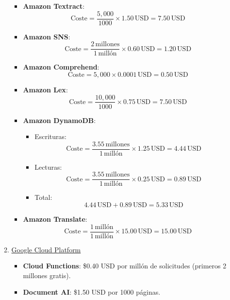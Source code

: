\begin{enumerate}
\begin{enumerate}
\begin{itemize}
					\item \textbf{Amazon Textract}:
						\[
							\text{Coste}= \frac{5,000}{1000}\times 1.50 \, \text{USD}= 7.50 \,
							\text{USD}
						\]

					\item \textbf{Amazon SNS}:
						\[
							\text{Coste}= \frac{2 \, \text{millones}}{1 \, \text{millón}}\times
							0.60 \, \text{USD}= 1.20 \, \text{USD}
						\]

					\item \textbf{Amazon Comprehend}:
						\[
							\text{Coste}= 5,000 \times 0.0001 \, \text{USD}= 0.50 \, \text{USD}
						\]

					\item \textbf{Amazon Lex}:
						\[
							\text{Coste}= \frac{10,000}{1000}\times 0.75 \, \text{USD}= 7.50 \,
							\text{USD}
						\]

					\item \textbf{Amazon DynamoDB}:
						\begin{itemize}
							\item Escrituras:
								\[
									\text{Coste}= \frac{3.55 \, \text{millones}}{1 \,
									\text{millón}}\times 1.25 \, \text{USD}= 4.44 \, \text{USD}
								\]

							\item Lecturas:
								\[
									\text{Coste}= \frac{3.55 \, \text{millones}}{1 \,
									\text{millón}}\times 0.25 \, \text{USD}= 0.89 \, \text{USD}
								\]

							\item Total:
								\[
									4.44 \, \text{USD}+ 0.89 \, \text{USD}= 5.33 \, \text{USD}
								\]
						\end{itemize}

					\item \textbf{Amazon Translate}:
						\[
							\text{Coste}= \frac{1 \, \text{millón}}{1 \, \text{millón}}\times 1
							5.00 \, \text{USD}= 15.00 \, \text{USD}
						\]
				\end{itemize}

			\item \underline{Google Cloud Platform}

				\begin{itemize}
					\item \textbf{Cloud Functions}: \$0.40 USD por millón de solicitudes (primeros
						2 millones gratis).

					\item \textbf{Document AI}: \$1.50 USD por 1000 páginas.


\end{itemize}
\end{enumerate}
\end{enumerate}
